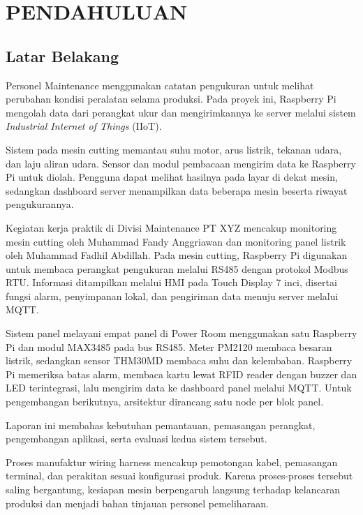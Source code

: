 \chapter{PENDAHULUAN}
\section{Latar Belakang}

Personel Maintenance menggunakan catatan pengukuran untuk melihat perubahan kondisi peralatan selama produksi. Pada proyek ini, Raspberry Pi mengolah data dari perangkat ukur dan mengirimkannya ke server melalui sistem \textit{Industrial Internet of Things} (IIoT).

Sistem pada mesin cutting memantau suhu motor, arus listrik, tekanan udara, dan laju aliran udara. Sensor dan modul pembacaan mengirim data ke Raspberry Pi untuk diolah. Pengguna dapat melihat hasilnya pada layar di dekat mesin, sedangkan dashboard server menampilkan data beberapa mesin beserta riwayat pengukurannya.

Kegiatan kerja praktik di Divisi Maintenance PT XYZ mencakup monitoring mesin cutting oleh Muhammad Fandy Anggriawan dan monitoring panel listrik oleh Muhammad Fadhil Abdillah. Pada mesin cutting, Raspberry Pi digunakan untuk membaca perangkat pengukuran melalui RS485 dengan protokol Modbus RTU. Informasi ditampilkan melalui HMI pada Touch Display 7 inci, disertai fungsi alarm, penyimpanan lokal, dan pengiriman data menuju server melalui MQTT.

Sistem panel melayani empat panel di Power Room menggunakan satu Raspberry Pi dan modul MAX3485 pada bus RS485. Meter PM2120 membaca besaran listrik, sedangkan sensor THM30MD membaca suhu dan kelembaban. Raspberry Pi memeriksa batas alarm, membaca kartu lewat RFID reader dengan buzzer dan LED terintegrasi, lalu mengirim data ke dashboard panel melalui MQTT. Untuk pengembangan berikutnya, arsitektur dirancang satu node per blok panel.

Laporan ini membahas kebutuhan pemantauan, pemasangan perangkat, pengembangan aplikasi, serta evaluasi kedua sistem tersebut.

Proses manufaktur wiring harness mencakup pemotongan kabel, pemasangan terminal, dan perakitan sesuai konfigurasi produk. Karena proses-proses tersebut saling bergantung, kesiapan mesin berpengaruh langsung terhadap kelancaran produksi dan menjadi bahan tinjauan personel pemeliharaan.

